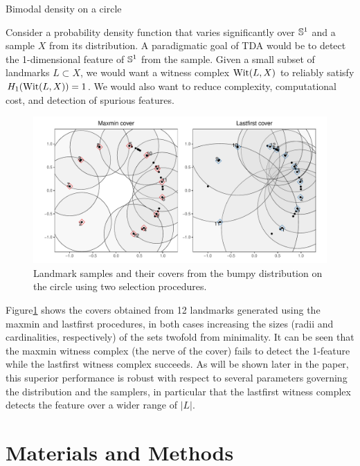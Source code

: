 \documentclass{article}
\begin{document}
\begin{example}{Bimodal density on a circle}
\label{ex:bumpy-circle}

Consider a probability density function that varies significantly over $\mathbb{S}^1$ and a sample $X$ from its distribution.
A paradigmatic goal of TDA would be to detect the 1-dimensional feature of $\mathbb{S}^1$ from the sample.
Given a small subset of landmarks $L \subset X$, we would want a witness complex $\operatorname{Wit}(L,X)$ to reliably satisfy $H_1(\operatorname{Wit}(L,X)) = 1$.
We would also want to reduce complexity, computational cost, and detection of spurious features.

\begin{figure}
\includegraphics[width=\textwidth]{bumpy-covers}
\caption{
Landmark samples and their covers from the bumpy distribution on the circle using two selection procedures.
\label{fig:bumpy-cover}
}
\end{figure}

Figure\nbs\ref{fig:bumpy-cover} shows the covers obtained from 12 landmarks generated using the maxmin and lastfirst procedures, in both cases increasing the sizes (radii and cardinalities, respectively) of the sets twofold from minimality.
It can be seen that the maxmin witness complex (the nerve of the cover) fails to detect the 1-feature while the lastfirst witness complex succeeds.
As will be shown later in the paper, this superior performance is robust with respect to several parameters governing the distribution and the samplers, in particular that the lastfirst witness complex detects the feature over a wider range of $\lvert L \rvert$.

\end{example}

\hypertarget{materials-and-methods}{%
\section{Materials and Methods}\label{materials-and-methods}}
\end{document}

